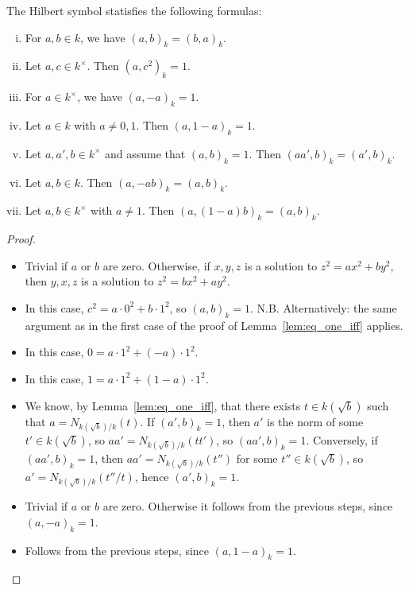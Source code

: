 \begin{proposition}
	\label{prop:hilbert_symbol_properties}
	\leanok
	The Hilbert symbol statisfies the following formulas:
	\begin{enumerate}[(i)]
		\item For $a, b \in k$, we have $(a, b)_k = (b, a)_k$.
		\item Let $a, c \in k^\times$. Then $(a, c^2)_k = 1$.
		\item For $a \in k^\times$, we have $(a, -a)_k = 1$.
		\item Let $a \in k$ with $a \ne 0, 1$. Then $(a, 1 - a)_k = 1$.
		\item Let $a, a', b \in k^\times$ and assume that $(a, b)_k = 1$. Then $(a a', b)_k = (a', b)_k$.
		\item Let $a, b \in k$. Then $(a, -ab)_k = (a, b)_k$.
		\item Let $a, b \in k^\times$ with $a \ne 1$. Then $(a, (1-a)b)_k = (a, b)_k$.
	\end{enumerate}
\end{proposition}

\begin{proof}
	\leanok

	\begin{itemize}
		\item Trivial if $a$ or $b$ are zero. Otherwise, if $x,y,z$ is a solution to $z^2 = ax^2 + by^2$, then $y,x,z$ is a solution to
	$z^2 = bx^2 + ay^2$.
		\item In this case, $c^2 = a \cdot 0^2 + b \cdot 1^2$, so $(a,b)_k=1$.
		N.B. Alternatively: the same argument as in the first case of the proof of Lemma~\ref{lem:eq_one_iff} applies.
		\item In this case, $0 = a \cdot 1^2 + (-a) \cdot 1^2$.
		\item In this case, $1 = a \cdot 1^2 + (1 - a) \cdot 1^2$.
		\item We know, by Lemma~\ref{lem:eq_one_iff}, that there exists $t \in k(\sqrt{b})$ such that
		$a = N_{k(\sqrt{b})/k}(t)$. If $(a',b)_k=1$, then $a'$ is the norm of some $t' \in k(\sqrt{b})$,
		so $aa' = N_{k(\sqrt{b})/k}(t t')$, so $(aa', b)_k = 1$. Conversely, if $(aa', b)_k = 1$, then
		$aa' = N_{k(\sqrt{b})/k}(t'')$ for some $t'' \in k(\sqrt{b})$, so
		$a' = N_{k(\sqrt{b})/k}(t''/t)$, hence $(a', b)_k = 1$.
		\item Trivial if $a$ or $b$ are zero. Otherwise it follows from the previous steps, since $(a, -a)_k = 1$.
		\item Follows from the previous steps, since $(a, 1 - a)_k = 1$.
	\end{itemize}
\end{proof}
